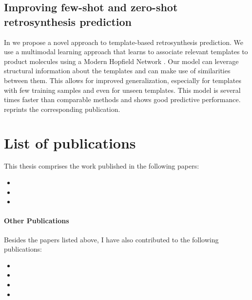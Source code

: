 \subsection{Improving few-shot and zero-shot retrosynthesis prediction}
In \citep{seidlImprovingFewZeroShot2022} we propose a novel approach to
template-based retrosynthesis prediction. We use a multimodal learning approach
that learns to associate relevant templates to product molecules using a Modern
Hopfield Network \citep{ramsauerHopfieldNetworksAll2020}. Our model can leverage
structural information about the templates and can make use of similarities
between them. This allows for improved generalization, especially for templates
with few training samples and even for unseen templates. This model is several
times faster than comparable methods and shows good predictive performance.
 reprints the corresponding publication.

\section{List of publications\label{sec:publications}}
This thesis comprises the work published in the following papers:

\begin{itemize}
    \item {}
    \item {}
    \item {}
\end{itemize}



\paragraph{Other Publications} Besides the papers listed above, I have also
contributed to the following publications:

\begin{itemize}
    \item {}
    \item {}
    \item {}
    \item {}
\end{itemize}